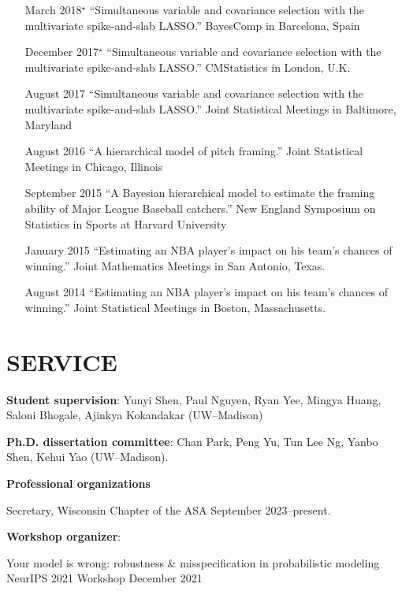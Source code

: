 \documentclass[margin]{res}
\begin{document}
\begin{resume}
\begin{itemize}
\item[March 2018$^{\star}$]{``Simultaneous variable and covariance selection with the multivariate spike-and-slab LASSO.'' BayesComp in Barcelona, Spain}

\item[December 2017$^{\star}$]{``Simultaneous variable and covariance selection with the multivariate spike-and-slab LASSO.'' CMStatistics in London, U.K.}

\item[August 2017]{``Simultaneous variable and covariance selection with the multivariate spike-and-slab LASSO.'' Joint Statistical Meetings in Baltimore, Maryland}

\item[August 2016]{``A hierarchical model of pitch framing.'' Joint Statistical Meetings in Chicago, Illinois}

\item[September 2015]{``A Bayesian hierarchical model to estimate the framing ability of Major League Baseball catchers.'' New England Symposium on Statistics in Sports at Harvard University}

\item[January 2015]{``Estimating an NBA player's impact on his team's chances of winning.'' Joint Mathematics Meetings in San Antonio, Texas.}

\item[August 2014]{``Estimating an NBA player's impact on his team's chances of winning.'' Joint Statistical Meetings in Boston, Massachusetts.}

\end{itemize}

\section{SERVICE}

\textbf{Student supervision}: Yunyi Shen, Paul Nguyen, Ryan Yee, Mingya Huang, Saloni Bhogale, Ajinkya Kokandakar (UW--Madison)

\textbf{Ph.D. dissertation committee}: Chan Park, Peng Yu, Tun Lee Ng, Yanbo Shen, Kehui Yao (UW--Madison).

\textbf{Professional organizations}

Secretary, Wisconsin Chapter of the ASA \hfill September 2023--present.


\textbf{Workshop organizer}: 

Your model is wrong: robustness \& misspecification in probabilistic modeling \\
NeurIPS 2021 Workshop \hfill December 2021


\end{resume}
\end{document}
